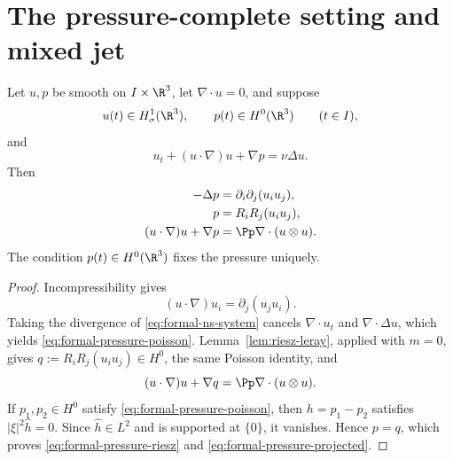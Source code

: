 \section{The pressure-complete setting and mixed jet}
\label{sec:formal-setting-mixed-jet}

\begin{proposition}
\label{prop:formal-pressure-normalization}
Let \(u,p\) be smooth on \(I\times\R^3\), let \(\nabla\cdot u=0\), and suppose
\[
 u(t)\in H^1_\sigma(\R^3),
 \qquad
 p(t)\in H^0(\R^3)
 \qquad(t\in I),
\]
and
\begin{equation}
 u_t+(u\cdot\nabla)u+\nabla p=\nu\Delta u.
 \label{eq:formal-ns-system}
\end{equation}
Then
\begin{align}
 -\Delta p
 &=\partial_i\partial_j(u_i u_j),
 \label{eq:formal-pressure-poisson}\\
 p
 &=R_iR_j(u_i u_j),
 \label{eq:formal-pressure-riesz}\\
 (u\cdot\nabla)u+\nabla p
 &=\Pp\nabla\cdot(u\otimes u).
 \label{eq:formal-pressure-projected}
\end{align}
The condition \(p(t)\in H^0(\R^3)\) fixes the pressure uniquely.
\end{proposition}

\begin{proof}
Incompressibility gives
\[
 (u\cdot\nabla)u_i=\partial_j(u_j u_i).
\]
Taking the divergence of \eqref{eq:formal-ns-system} cancels
\(\nabla\cdot u_t\) and \(\nabla\cdot\Delta u\), which yields
\eqref{eq:formal-pressure-poisson}.  Lemma~\ref{lem:riesz-leray}, applied
with \(m=0\), gives \(q:=R_iR_j(u_i u_j)\in H^0\), the same Poisson
identity, and
\[
 (u\cdot\nabla)u+\nabla q=\Pp\nabla\cdot(u\otimes u).
\]
If \(p_1,p_2\in H^0\) satisfy \eqref{eq:formal-pressure-poisson}, then
\(h=p_1-p_2\) satisfies
\(|\xi|^2\widehat h=0\).  Since \(\widehat h\in L^2\) and is supported at
\(\{0\}\), it vanishes.  Hence \(p=q\), which proves
\eqref{eq:formal-pressure-riesz} and \eqref{eq:formal-pressure-projected}.
\end{proof}

